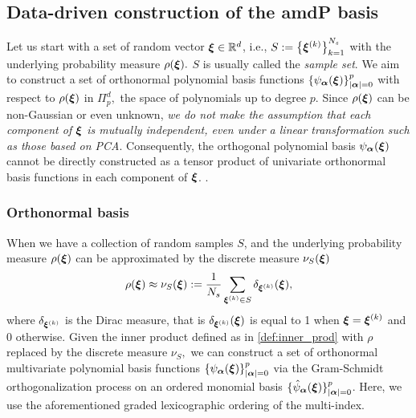 \subsection{Data-driven construction of the \ac{amdP} basis}\label{sec:data_driven_basis}
Let us start with a set of  random vector $\bm\xi \in \mathbb{R}^d$, i.e., $S := \left\{\bm\xi^{(k)}\right\}_{k = 1}^{N_s}$ with the underlying probability measure $\rho(\bm\xi).$ $S$ is usually called the \emph{sample set}.
We aim to construct a set of orthonormal polynomial basis functions $\left\{ \psi_{\bm\alpha}(\bm\xi)\right\}_{\vert \bm\alpha \vert = 0}^p$ with respect to  $\rho(\bm\xi)$ in $\Pi_p^d,$ the space of polynomials up to degree $p$.
Since $\rho(\bm\xi)$ can be non-Gaussian or even unknown, \emph{we do not make the assumption that {\color{blue} each component of $\bm\xi$ is mutually} independent, even under a linear transformation such as those based on \ac{PCA}}.
Consequently, the orthogonal polynomial basis $\psi_{\bm\alpha}(\bm\xi)$ cannot 
be directly constructed as a tensor product 
of univariate {\color{blue}orthonormal basis functions in each 
component of $\bm\xi$}. .

\subsubsection{Orthonormal basis}
When we have a collection of random samples $S$, and the 
underlying probability measure $\rho(\bm\xi)$ can be approximated by the 
discrete measure $\nu_S(\bm\xi)$
\begin{equation}\label{def:disc_meas}
  \rho(\bm\xi) \approx \displaystyle \nu_S(\bm\xi) := \frac{1}{N_s}\sum_{\bm\xi^{(k)} \in S}\delta_{\bm\xi^{(k)}}(\bm\xi),
\end{equation}
where $\delta_{\bm\xi^{(k)}}$ is the Dirac measure, that is $\delta_{\bm\xi^{(k)}}(\bm\xi)$ is equal to 1 when $\bm\xi = \bm\xi^{(k)}$ and 0 otherwise.
Given the inner product defined as in \eqref{def:inner_prod} with $\rho$ replaced by the discrete measure $\nu_{S},$ we 
can construct a set of orthonormal multivariate polynomial basis functions $\left\{\psi_{\bm\alpha}(\bm\xi)\right\}_{\vert \bm\alpha \vert = 0}^{p}$ 
via the Gram-Schmidt orthogonalization process on an ordered monomial basis $\{\hat{\psi}_{\bm{\alpha}}(\bm\xi)\}_{|\bm\alpha|=0}^p$. 
Here, we use the aforementioned {graded lexicographic ordering} of the multi-index.

